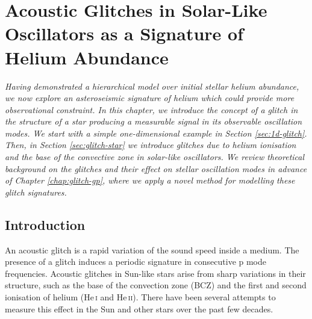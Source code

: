 %
%
%
%
%
\chapter[Acoustic Glitches in Solar-Like Oscillators]{Acoustic Glitches in Solar-Like Oscillators as a Signature of Helium Abundance}\label{chap:glitch}

\textit{Having demonstrated a hierarchical model over initial stellar helium abundance, we now explore an asteroseismic signature of helium which could provide more observational constraint. In this chapter, we introduce the concept of a glitch in the structure of a star producing a measurable signal in its observable oscillation modes. We start with a simple one-dimensional example in Section \ref{sec:1d-glitch}. Then, in Section \ref{sec:glitch-star} we introduce glitches due to helium ionisation and the base of the convective zone in solar-like oscillators. We review theoretical background on the glitches and their effect on stellar oscillation modes in advance of Chapter \ref{chap:glitch-gp}, where we apply a novel method for modelling these glitch signatures.}

\section{Introduction}


An acoustic glitch is a rapid variation of the sound speed inside a medium. The presence of a glitch induces a periodic signature in consecutive p mode frequencies. Acoustic glitches in Sun-like stars arise from sharp variations in their structure, such as the base of the convection zone (BCZ) and the first and second ionisation of helium (He\,\textsc{i} and He\,\textsc{ii}). There have been several attempts to measure this effect in the Sun and other stars over the past few decades.

